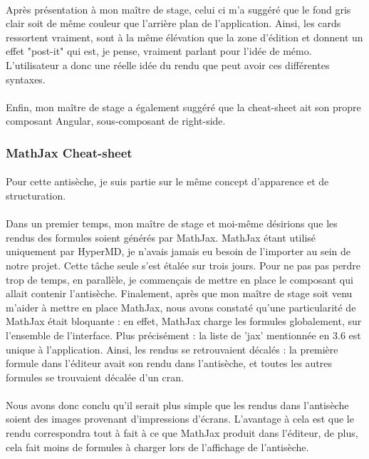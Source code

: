 \documentclass[12pt]{article}
\begin{document}
\paragraph{}
Après présentation à mon maître de stage, celui ci m'a suggéré que le fond gris clair soit de même couleur que l'arrière plan de l'application. Ainsi, les cards ressortent vraiment, sont à la même élévation que la zone d'édition et donnent un effet "post-it" qui est, je pense, vraiment parlant pour l'idée de mémo. L'utilisateur a donc une réelle idée du rendu que peut avoir ces différentes syntaxes.
\paragraph{}
Enfin, mon maître de stage a également suggéré que la cheat-sheet ait son propre composant Angular, sous-composant de right-side.\\

\subsubsection{MathJax Cheat-sheet}
\paragraph{}
Pour cette antisèche, je suis partie sur le même concept d'apparence et de structuration.
\paragraph{}
Dans un premier temps, mon maître de stage et moi-même désirions que les rendus des formules soient générés par MathJax. MathJax étant utilisé uniquement par HyperMD, je n'avais jamais eu besoin de l'importer au sein de notre projet. Cette tâche seule s'est étalée sur trois jours. Pour ne pas pas perdre trop de temps, en parallèle, je commençais de mettre en place le composant qui allait contenir l'antisèche. Finalement, après que mon maître de stage soit venu m'aider à mettre en place MathJax, nous avons constaté qu'une particularité de MathJax était bloquante : en effet, MathJax charge les formules globalement, sur l'ensemble de l'interface. Plus précisément : la liste de 'jax' mentionnée en 3.6 est unique à l'application. Ainsi, les rendus se retrouvaient décalés : la première formule dans l'éditeur avait son rendu dans l'antisèche, et toutes les autres formules se trouvaient décalée d'un cran.
\paragraph{}
Nous avons donc conclu qu'il serait plus simple que les rendus dans l'antisèche soient des images provenant d'impressions d'écrans. L'avantage à cela est que le rendu correspondra tout à fait à ce que MathJax produit dans l'éditeur, de plus, cela fait moins de formules à charger lors de l'affichage de l'antisèche.\\
\end{document}
